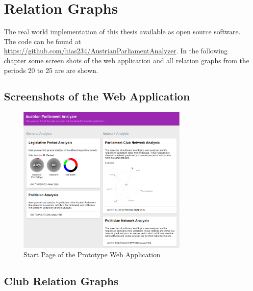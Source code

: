 \chapter{Relation Graphs}
\label{appendix:Relation Graphs}

\newcommand{\versionEL}{2.2}
\newcommand{\versionJava}{1.7.0\_45-b18}
\newcommand{\versionJSF}{2.1.7}
\newcommand{\versionJSP}{2.2}
\newcommand{\versionMaven}{3.1.1}
\newcommand{\versionObjectAid}{1.1.6}
\newcommand{\versionPrimeFaces}{3.3.1}
\newcommand{\versionServlet}{3.0}
\newcommand{\versionSigmaJS}{0.1}
\newcommand{\versionSpring}{3.1.1}
\newcommand{\versionSpringWebflow}{2.3.1}
\newcommand{\versionTomcat}{7.0.29}
\newcommand{\versionZooKeeper}{3.4.5}

The real world implementation of this thesis available as open source software. The code can be found at \url{https://github.com/hias234/AustrianParliamentAnalyzer}. In the following chapter some screen shots of the web application and all relation graphs from the periods 20 to 25 are are shown.

\section{Screenshots of the Web Application}

\begin{figure}[h]
	\center
	\includegraphics[width=0.75\textwidth]{imgs/result_start_page}
	\caption{Start Page of the Prototype Web Application}
	\label{fig:start_page}
\end{figure}

\section{Club Relation Graphs}

